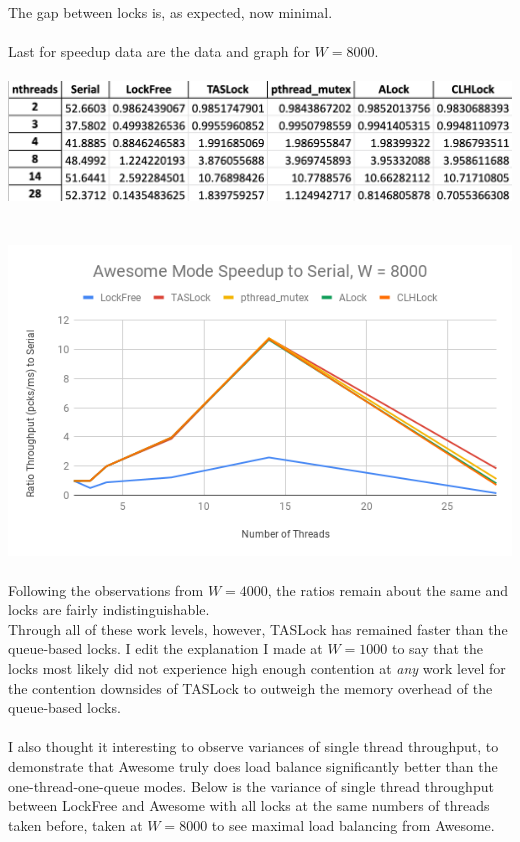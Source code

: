 \documentclass{article}
\begin{document}
\begin{adjustwidth}{-2cm}{-2cm}
The gap between locks is, as expected, now minimal.\\
\null\\Last for speedup data are the data and graph for $W=8000$.\\
\null\\
\includegraphics[width=\linewidth]{b_awe8000Data.png}\\ \null\\
\null\\
\includegraphics[width=\linewidth]{b_awe8000Graph.png}\\ \null\\
Following the observations from $W=4000$, the ratios remain about the same and locks are fairly indistinguishable.\\
Through all of these work levels, however, TASLock has remained faster than the queue-based locks. I edit the explanation I made at $W=1000$ to say that the locks most likely did not experience high enough contention at \textit{any} work level for the contention downsides of TASLock to outweigh the memory overhead of the queue-based locks.\\
\null\\I also thought it interesting to observe variances of single thread throughput, to demonstrate that Awesome truly does load balance significantly better than the one-thread-one-queue modes. Below is the variance of single thread throughput between LockFree and Awesome with all locks at the same numbers of threads taken before, taken at $W=8000$ to see maximal load balancing from Awesome.\\

\end{adjustwidth}
\end{document}
